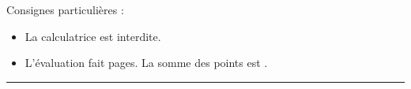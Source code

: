 

\SetDate[17/04/2026]
\reversemarginpar
\setlength{\marginparsep}{.5cm}


\pagestyle{fancy}
\fancyhead[R]{\today}

\null\vspace{-30pt}
Consignes particulières : 
\begin{itemize}[label=$\bullet$]
	\item 
	La calculatrice est {interdite}.
	\item
	L'évaluation fait \pageref{lastpage} pages. La somme des points est .
\end{itemize}

\marginpar{[pts]}
\hrule




